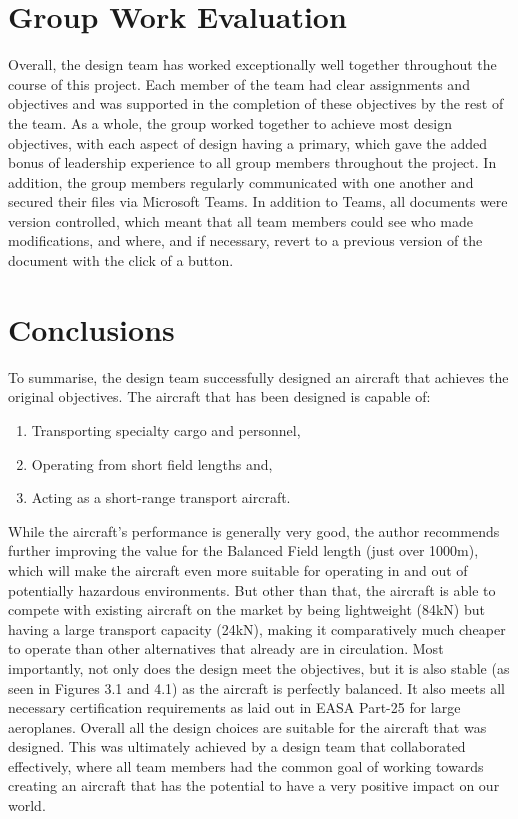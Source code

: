 \documentclass[stu, a4paper, 12pt, floatsintext]{apa7}
\numberwithin{figure}{section}
\numberwithin{table}{section}
\numberwithin{equation}{section}
\begin{document}
\section{Group Work Evaluation}
Overall, the design team has worked exceptionally well together throughout the course of this project. Each member of the team had clear assignments and objectives and was supported in the completion of these objectives by the rest of the team. As a whole, the group worked together to achieve most design objectives, with each aspect of design having a primary, which gave the added bonus of leadership experience to all group members throughout the project. In addition, the group members regularly communicated with one another and secured their files via Microsoft Teams. In addition to Teams, all documents were version controlled, which meant that all team members could see who made modifications, and where, and if necessary, revert to a previous version of the document with the click of a button.  
\section{Conclusions}
To summarise, the design team successfully designed an aircraft that achieves the original objectives. The aircraft that has been designed is capable of:
\begin{enumerate}
    \item Transporting specialty cargo and personnel, 
    \item Operating from short field lengths and,
    \item Acting as a short-range transport aircraft.
\end{enumerate}
While the aircraft's performance is generally very good, the author recommends further improving the value for the Balanced Field length (just over 1000m), which will make the aircraft even more suitable for operating in and out of potentially hazardous environments. But other than that, the aircraft is able to compete with existing aircraft on the market by being lightweight (84kN) but having a large transport capacity (24kN), making it comparatively much cheaper to operate than other alternatives that already are in circulation. Most importantly, not only does the design meet the objectives, but it is also stable (as seen in Figures 3.1 and 4.1) as the aircraft is perfectly balanced. It also meets all necessary certification requirements as laid out in EASA Part-25 for large aeroplanes. Overall all the design choices are suitable for the aircraft that was designed. 
This was ultimately achieved by a design team that collaborated effectively, where all team members had the common goal of working towards creating an aircraft that has the potential to have a very positive impact on our world.

\printbibliography
\end{document}
